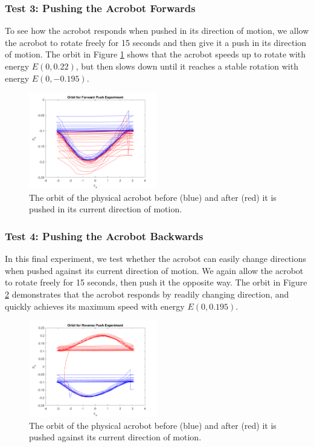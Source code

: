 \subsubsection*{Test 3: Pushing the Acrobot Forwards}
To see how the acrobot responds when pushed in its direction of motion, we allow
the acrobot to rotate freely for 15 seconds and then give it a push in its
direction of motion.
The orbit in Figure \ref{fig:acrobot-fpush-orbit} shows that the acrobot speeds
up to rotate with energy \(E(0,0.22)\), but then slows down until it reaches a
stable rotation with energy \(E(0,-0.195)\).

\begin{figure}[ht]
    \centering
    \includegraphics[width=0.5\textwidth]{images/acrobot_fpush_orbit.png}
    \caption{The orbit of the physical acrobot before (blue) and after (red) it
    is pushed in its current direction of motion.}
    \label{fig:acrobot-fpush-orbit}
\end{figure}

\subsubsection*{Test 4: Pushing the Acrobot Backwards}
In this final experiment, we test whether the acrobot can easily change
directions when pushed against its current direction of motion.
We again allow the acrobot to rotate freely for 15 seconds, then push it the
opposite way.
The orbit in Figure \ref{fig:acrobot-rpush-orbit} demonstrates that the acrobot
responds by readily changing direction, and quickly achieves its maximum speed
with energy \(E(0,0.195)\).

\begin{figure}[ht]
    \centering
    \includegraphics[width=0.5\textwidth]{images/acrobot_rpush_orbit.png}
    \caption{The orbit of the physical acrobot before (blue) and after (red) it
    is pushed against its current direction of motion.}
    \label{fig:acrobot-rpush-orbit}
\end{figure}

